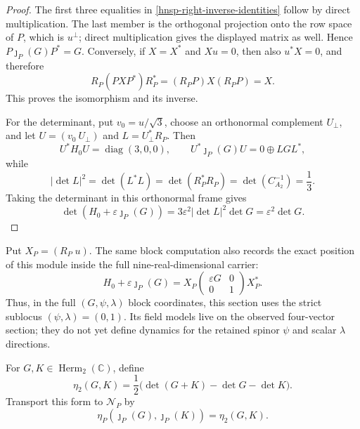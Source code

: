 \begin{proof}
The first three equalities in
\eqref{hnsp-right-inverse-identities} follow by direct multiplication.  The
last member is the orthogonal projection onto the row space of \(P\), which is
\(u^\perp\); direct multiplication gives the displayed matrix as well.  Hence
\(P\jmath_P(G)P^*=G\).  Conversely, if \(X=X^*\) and \(Xu=0\), then also
\(u^*X=0\), and therefore
\[
 R_P(PXP^*)R_P^*=(R_P P)X(R_P P)=X.
\]
This proves the isomorphism and its inverse.

For the determinant, put \(v_0=u/\sqrt3\), choose an orthonormal complement
\(U_\perp\), and let \(U=(v_0\ U_\perp)\) and
\(L=U_\perp^*R_P\).  Then
\[
 U^*H_0U=\operatorname{diag}(3,0,0),\qquad
 U^*\jmath_P(G)U=0\oplus LGL^*,
\]
while
\[
 |\det L|^2=\det(L^*L)=\det(R_P^*R_P)
 =\det(C_{A_2}^{-1})=\frac13.
\]
Taking the determinant in this orthonormal frame gives
\[
 \det(H_0+\varepsilon\jmath_P(G))
 =3\varepsilon^2|\det L|^2\det G
 =\varepsilon^2\det G.
\]
\end{proof}

Put \(X_P=(R_P\;u)\).  The same block computation also records the exact
position of this module inside the full nine-real-dimensional carrier:
\[
 H_0+\varepsilon\jmath_P(G)
 =X_P\begin{pmatrix}\varepsilon G&0\\0&1\end{pmatrix}X_P^*.
\]
Thus, in the full \((G,\psi,\lambda)\) block coordinates, this section uses
the strict sublocus \((\psi,\lambda)=(0,1)\).  Its field models live on the
observed four-vector section; they do not yet define dynamics for the retained
spinor \(\psi\) and scalar \(\lambda\) directions.

For \(G,K\in\operatorname{Herm}_2(\mathbb C)\), define
\begin{equation}
 \eta_2(G,K)=\frac12\bigl(\det(G+K)-\det G-\det K\bigr).
 \label{hnsp-polarized-determinant}
\end{equation}
Transport this form to \(\mathcal N_P\) by
\begin{equation}
 \eta_P(\jmath_P(G),\jmath_P(K))=\eta_2(G,K).
 \label{hnsp-transported-metric}
\end{equation}

